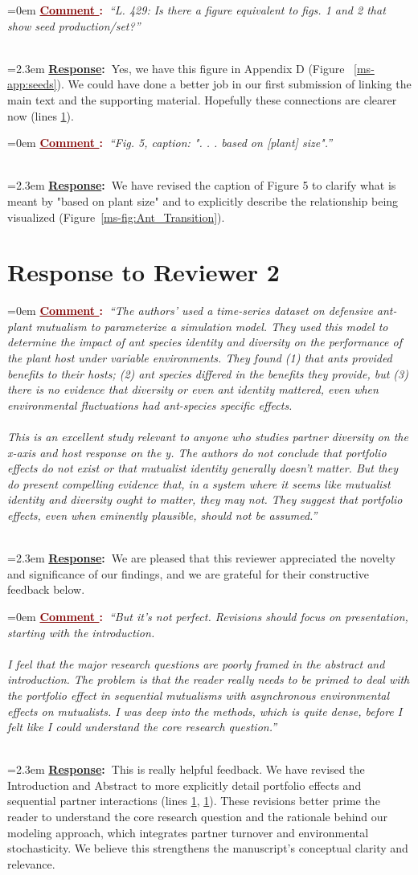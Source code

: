 \documentclass[12pt]{article}
\newcounter{cN}
\newcommand{\comment}[1]{
	\vspace{2em}
	\refstepcounter{cN} %
	\noindent \hangindent=0em \textbf{\textcolor{Maroon}{\uline{Comment \thecN}:~}}\emph{``#1''}
	}
\newcommand{\response}[1]{
	\\[0.25em]
	\hangindent=2.3em \textbf{\textcolor{NavyBlue}{\uline{Response}:~}}#1
	}
\begin{document}
\comment{L. 429: Is there a figure equivalent to figs. 1 and 2 that show seed production/set?}
\response{Yes, we have this figure in Appendix D (Figure ~\ref{ms-app:seeds}). 
	We could have done a better job in our first submission of linking the main text and the supporting material. 
	Hopefully these connections are clearer now (lines \ref{}).}

\comment{Fig. 5, caption: ". . . based on [plant] size".}
\response{We have revised the caption of Figure 5 to clarify what is meant by "based on plant size" and to explicitly describe the relationship being visualized (Figure~\ref{ms-fig:Ant_Transition}).}

\section{Response to Reviewer 2}
\vspace{-2em}

\comment{The authors' used a time-series dataset on defensive ant-plant mutualism to parameterize a simulation model. They used this model to determine the impact of ant species identity and diversity on the performance of the plant host under variable environments. They found (1) that ants provided benefits to their hosts; (2) ant species differed in the benefits they provide, but (3) there is no evidence that diversity or even ant identity mattered, even when environmental fluctuations had ant-species specific effects.
\\
\\	
This is an excellent study relevant to anyone who studies partner diversity on the x-axis and host response on the y. The authors do not conclude that portfolio effects do not exist or that mutualist identity generally doesn't matter. But they do present compelling evidence that, in a system where it seems like mutualist identity and diversity ought to matter, they may not. They suggest that portfolio effects, even when eminently plausible, should not be assumed.}
\response{We are pleased that this reviewer appreciated the novelty and significance of our findings, and we are grateful for their constructive feedback below.}

\comment{But it's not perfect. Revisions should focus on presentation, starting with the introduction.
\\
\\
I feel that the major research questions are poorly framed in the abstract and introduction. 
The problem is that the reader really needs to be primed to deal with the portfolio effect in sequential mutualisms with asynchronous environmental effects on mutualists. 
I was deep into the methods, which is quite dense, before I felt like I could understand the core research question.}
\response{This is really helpful feedback. 
	We have revised the Introduction and Abstract to more explicitly detail portfolio effects and sequential partner interactions (lines \ref{}, \ref{}).
	These revisions better prime the reader to understand the core research question and the rationale behind our modeling approach, which integrates partner turnover and environmental stochasticity. 
	We believe this strengthens the manuscript’s conceptual clarity and relevance.}
\end{document}
